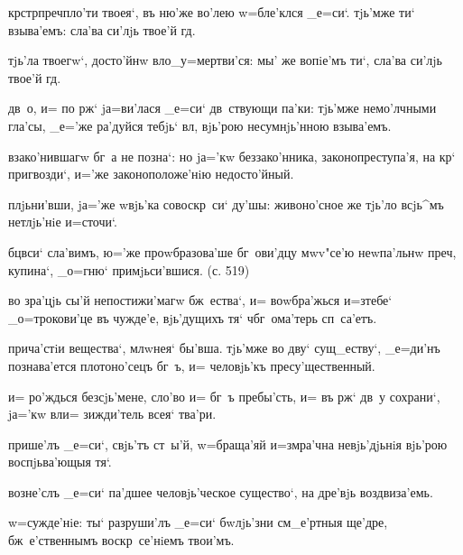 кр стр преч пло'ти твоея`, въ ню'же во'лею 
w=бле'клся _е=си`. тjь'мже ти` взыва'емъ: сла'ва си'лjь 
твое'й гд.

тjь'ла твоегw`, досто'йнw вл о_у=мертви'ся: мы' же 
вопiе'мъ ти`, сла'ва си'лjь твое'й гд.

дв~о, и= по рж` jа=ви'лася _е=си` дв~ствующи па'ки: 
тjь'мже немо'лчными гла'сы, _е='же ра'дуйся тебjь` 
вл, вjь'рою несумнjь'нною взыва'емъ.


взако'нившагw бг~а не позна`: но jа='кw беззако'нника, 
законопреступа'я, на кр` пригвозди`, и='же 
законоположе'нiю недосто'йный.

плjьни'вши, jа='же w\т вjь'ка совоскр~си` ду'шы: 
живоно'сное же тjь'ло всjь^мъ нетлjь'нiе и=сточи`.

бц вси` сла'вимъ, ю='же проwбразова'ше бг~ови'дцу 
мwv"се'ю неwпа'льнw преч, купина`, _о=гню` 
примjьси'вшися. (с. 519)


во зра'цjь сы'й непостижи'магw бж~ества`, и= воwбра'жься 
и=з\ъ тебе` _о=трокови'це въ чужде'е, вjь'дущихъ тя` 
ч бг~ома'терь сп~са'етъ.

прича'стiи вещества`, мл w\т нея` бы'вша. тjь'мже во 
дву` сущ_еству`, _е=ди'нъ познава'ется плотоно'сецъ бг~ъ, 
и= человjь'къ пресу'щественный.

и= ро'ждься без\ъ сjь'мене, сло'во и= бг~ъ пребы'сть, и= 
въ рж` дв~у сохрани`, jа='кw вл и= зижди'тель 
всея` тва'ри.


прише'лъ _е=си`, свjь'тъ ст~ы'й, w=браща'яй и=з\ъ мра'чна 
невjь'дjьнiя вjь'рою воспjьва'ющыя тя`.

возне'слъ _е=си` па'дшее человjь'ческое существо`, на 
дре'вjь воздвиза'емь.

w=сужде'нiе: ты` разруши'лъ _е=си` бwлjь'зни см_е'ртныя 
ще'дре, бж~е'ственнымъ воскр~се'нiемъ твои'мъ.

